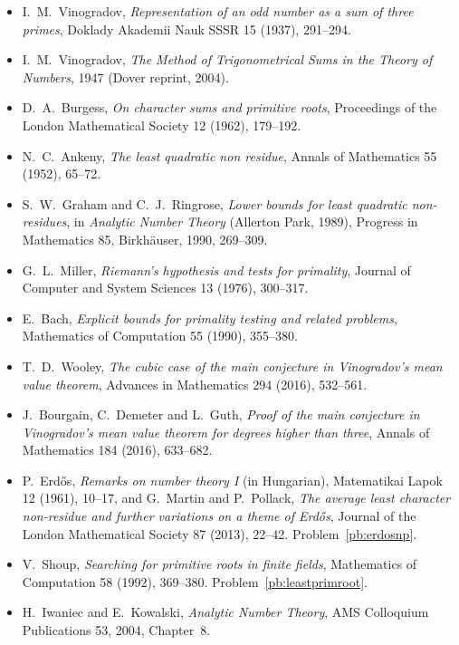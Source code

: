 \begin{itemize}
\item I.~M.~Vinogradov, \emph{Representation of an odd number as a sum of three primes}, Doklady Akademii Nauk SSSR 15 (1937), 291--294.
\item I.~M.~Vinogradov, \emph{The Method of Trigonometrical Sums in the Theory of Numbers}, 1947 (Dover reprint, 2004).
\item D.~A.~Burgess, \emph{On character sums and primitive roots}, Proceedings of the London Mathematical Society 12 (1962), 179--192.
\item N.~C.~Ankeny, \emph{The least quadratic non residue}, Annals of Mathematics 55 (1952), 65--72.
\item S.~W.~Graham and C.~J.~Ringrose, \emph{Lower bounds for least quadratic non-residues}, in \emph{Analytic Number Theory} (Allerton Park, 1989), Progress in Mathematics 85, Birkhäuser, 1990, 269--309.
\item G.~L.~Miller, \emph{Riemann's hypothesis and tests for primality}, Journal of Computer and System Sciences 13 (1976), 300--317.
\item E.~Bach, \emph{Explicit bounds for primality testing and related problems}, Mathematics of Computation 55 (1990), 355--380.
\item T.~D.~Wooley, \emph{The cubic case of the main conjecture in Vinogradov's mean value theorem}, Advances in Mathematics 294 (2016), 532--561.
\item J.~Bourgain, C.~Demeter and L.~Guth, \emph{Proof of the main conjecture in Vinogradov's mean value theorem for degrees higher than three}, Annals of Mathematics 184 (2016), 633--682.
\item P.~Erd\H os, \emph{Remarks on number theory I} (in Hungarian), Matematikai Lapok 12 (1961), 10--17, and G.~Martin and P.~Pollack, \emph{The average least character non-residue and further variations on a theme of Erd\H os}, Journal of the London Mathematical Society 87 (2013), 22--42. Problem~\ref{pb:erdosnp}.
\item V.~Shoup, \emph{Searching for primitive roots in finite fields}, Mathematics of Computation 58 (1992), 369--380. Problem~\ref{pb:leastprimroot}.
\item H.~Iwaniec and E.~Kowalski, \emph{Analytic Number Theory}, AMS Colloquium Publications 53, 2004, Chapter~8.
\end{itemize}
